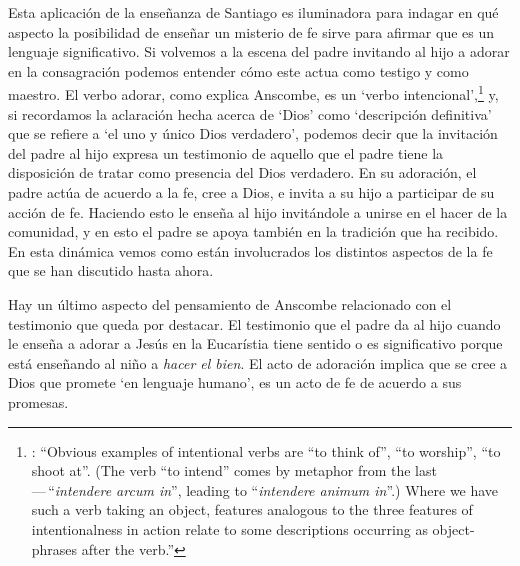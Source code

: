 Esta aplicación de la enseñanza de Santiago es iluminadora para indagar en qué aspecto la posibilidad de enseñar un misterio de fe sirve para afirmar que es un lenguaje significativo. Si volvemos a la escena del padre invitando al hijo a adorar en la consagración podemos entender cómo este actua como testigo y como maestro. El verbo adorar, como explica Anscombe, es un `verbo intencional',\footnote{\cite[4--5]{anscombe1981metaphysics:intsens}: \enquote{Obvious examples of intentional verbs are ``to think of'', ``to worship'', ``to shoot at''. (The verb ``to intend'' comes by metaphor from the last\,---\,``\emph{intendere arcum in}'', leading to ``\emph{intendere animum in}''.) Where we have such a verb taking an object, features analogous to the three features of intentionalness in action relate to some descriptions occurring as object-phrases after the verb.}} y, si recordamos la aclaración hecha acerca de `Dios' como `descripción definitiva' que se refiere a `el uno y único Dios verdadero', podemos decir que la invitación del padre al hijo expresa un testimonio de aquello que el padre tiene la disposición de tratar como presencia del Dios verdadero. En su adoración, el padre actúa de acuerdo a la fe, cree a Dios, e invita a su hijo a participar de su acción de fe. Haciendo esto le enseña al hijo invitándole a unirse en el hacer de la comunidad, y en esto el padre se apoya también en la tradición que ha recibido. En esta dinámica vemos como están involucrados los distintos aspectos de la fe que se han discutido hasta ahora.

Hay un último aspecto del pensamiento de Anscombe relacionado con el testimonio que queda por destacar. El testimonio que el padre da al hijo cuando le enseña a adorar a Jesús en la Eucarístia tiene sentido o es significativo porque está enseñando al niño a \emph{hacer el bien}. El acto de adoración implica que se cree a Dios que promete \enquote*{en lenguaje humano}, es un acto de fe de acuerdo a sus promesas.

